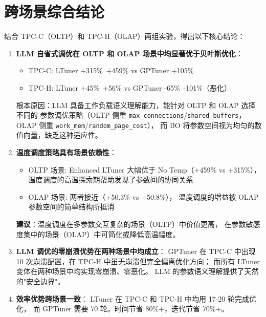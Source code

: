 \section{跨场景综合结论}

结合 TPC-C（OLTP）和 TPC-H（OLAP）两组实验，得出以下核心结论：

\begin{enumerate}
  \item \textbf{LLM 自省式调优在 OLTP 和 OLAP 场景中均显著优于贝叶斯优化}：
        \begin{itemize}
          \item TPC-C: LTuner +315\%~+459\% vs GPTuner +105\%
          \item TPC-H: LTuner +45\%~+56\% vs GPTuner -65\%~-101\%（恶化）
        \end{itemize}
        根本原因：LLM 具备工作负载语义理解能力，能针对 OLTP 和 OLAP 选择不同的
        参数调优策略（OLTP 侧重 \texttt{max\_connections}/\texttt{shared\_buffers}，
        OLAP 侧重 \texttt{work\_mem}/\texttt{random\_page\_cost}），
        而 BO 将参数空间视为均匀的数值向量，缺乏这种适应性。

  \item \textbf{温度调度策略具有场景依赖性}：
        \begin{itemize}
          \item OLTP 场景: Enhanced LTuner 大幅优于 No Temp（+459\% vs +315\%），
                温度调度的高温探索期帮助发现了参数间的协同关系
          \item OLAP 场景: 两者接近（+50.3\% vs +50.8\%），
                温度调度的增益被 OLAP 参数空间的简单结构所抵消
        \end{itemize}
        \textbf{建议}：温度调度在多参数交互复杂的场景（OLTP）中价值更高，
        在参数敏感度集中的场景（OLAP）中可简化或降低高温幅度。

  \item \textbf{LLM 调优的零崩溃优势在两种场景中均成立}：
        GPTuner 在 TPC-C 中出现 10 次崩溃配置，在 TPC-H 中虽无崩溃但完全偏离优化方向；
        而所有 LTuner 变体在两种场景中均实现零崩溃、零恶化。
        LLM 的参数语义理解提供了天然的"安全边界"。

  \item \textbf{效率优势跨场景一致}：
        LTuner 在 TPC-C 和 TPC-H 中均用 17-20 轮完成优化，
        而 GPTuner 需要 70 轮。时间节省 80\%+，迭代节省 70\%+。
\end{enumerate}
